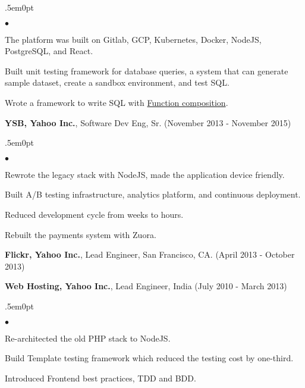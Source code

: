 \documentclass[margin, line, 10pt]{res}
\newenvironment{list2}{
  \begin{list}{$\bullet$}{%
      \setlength{\itemsep}{0in}
      \setlength{\parsep}{0in} \setlength{\parskip}{0in}
      \setlength{\topsep}{0in} \setlength{\partopsep}{0in}
      \setlength{\leftmargin}{0.2in}}}{\end{list}}
\begin{document}
\begin{resume}
\begin{adjustwidth}{.5em}{0pt}
  \begin{list2}
  \vspace{.2cm}
  \item The platform was built on Gitlab, GCP, Kubernetes, Docker, NodeJS, PostgreSQL, and React.
  \item Built unit testing framework for database queries, a system that can generate sample dataset, create a sandbox environment, and test SQL.
  \item Wrote a framework to write SQL with \href{https://en.wikipedia.org/wiki/Function_composition_(computer_science)}{Function composition}.
  \end{list2}
  \vspace{.05cm}
\end{adjustwidth}


{\Large {\bf YSB, Yahoo Inc.}}, Software Dev Eng, Sr. \hfill (November 2013 - November 2015)\\
\begin{adjustwidth}{.5em}{0pt}
\vspace{-.3cm}
\begin{list2}
\vspace{.1cm}
\item Rewrote the legacy stack with NodeJS, made the application device friendly.
\item Built A/B testing infrastructure, analytics platform, and continuous deployment.
\item Reduced development cycle from weeks to hours.
\item Rebuilt the payments system with Zuora.
\end{list2}
\vspace{.05cm}
\end{adjustwidth}

{\Large {\bf Flickr, Yahoo Inc.}}, Lead Engineer, San Francisco, CA.  \hfill (April 2013 - October 2013)\\
\vspace{-.3cm}

{\Large {\bf Web Hosting, Yahoo Inc.}}, Lead Engineer, India  \hfill (July 2010 - March 2013)\\
\begin{adjustwidth}{.5em}{0pt}
\begin{list2}
\vspace{-.2cm}
\item Re-architected the old PHP stack to NodeJS.\\
\vspace{-.3cm}
\item Build Template testing framework which reduced the testing cost by one-third.\\
\vspace{-.3cm}
\item Introduced Frontend best practices, TDD and BDD.\\
\end{list2}
\vspace{.05cm}
\end{adjustwidth}


\end{resume}
\end{document}
